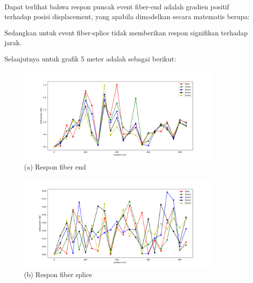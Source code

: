 \documentclass[12pt]{article}
\begin{document}
	Dapat terlihat bahwa respon puncak event fiber-end adalah gradien positif terhadap posisi displacement, yang apabila dimodelkan secara matematis berupa:  
	
	Sedangkan untuk event fiber-splice tidak memberikan respon signifikan terhadap jarak.

	Selanjutnya untuk grafik 5 meter adalah sebagai berikut:
	
	\begin{figure}[!h]
		\centering
		\captionsetup{justification=centering}
		\includegraphics[width=0.9\textwidth]{images/Bab_4/Bab_4_5g1}	
		\caption{\small{(a) Respon fiber end}}
	\end{figure}
	
	\begin{figure}[!h]
		\centering
		\captionsetup{justification=centering}
		\includegraphics[width=0.9\textwidth]{images/Bab_4/Bab_4_5g2}	
		\caption{\small{(b) Respon fiber splice}}
	\end{figure}
	
\end{document}
